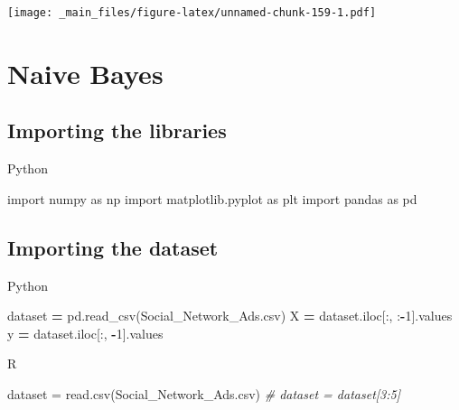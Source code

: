 \documentclass[
]{book}
\newenvironment{Shaded}{\begin{snugshade}}{\end{snugshade}}
\newcommand{\CommentTok}[1]{\textcolor[rgb]{0.56,0.35,0.01}{\textit{#1}}}
\newcommand{\DecValTok}[1]{\textcolor[rgb]{0.00,0.00,0.81}{#1}}
\newcommand{\FunctionTok}[1]{\textcolor[rgb]{0.00,0.00,0.00}{#1}}
\newcommand{\ImportTok}[1]{#1}
\newcommand{\NormalTok}[1]{#1}
\newcommand{\OperatorTok}[1]{\textcolor[rgb]{0.81,0.36,0.00}{\textbf{#1}}}
\newcommand{\OtherTok}[1]{\textcolor[rgb]{0.56,0.35,0.01}{#1}}
\newcommand{\StringTok}[1]{\textcolor[rgb]{0.31,0.60,0.02}{#1}}
\theoremstyle{definition}
\theoremstyle{definition}
\theoremstyle{definition}
\theoremstyle{definition}
\theoremstyle{remark}
\begin{document}
\texttt{[image: \_main\_files/figure-latex/unnamed-chunk-159-1.pdf]}

\hypertarget{naive-bayes}{%
\section{Naive Bayes}\label{naive-bayes}}

\hypertarget{importing-the-libraries-11}{%
\subsection{Importing the libraries}\label{importing-the-libraries-11}}

Python

\begin{Shaded}
\begin{Highlighting}[]
\ImportTok{import}\NormalTok{ numpy }\ImportTok{as}\NormalTok{ np}
\ImportTok{import}\NormalTok{ matplotlib.pyplot }\ImportTok{as}\NormalTok{ plt}
\ImportTok{import}\NormalTok{ pandas }\ImportTok{as}\NormalTok{ pd}
\end{Highlighting}
\end{Shaded}

\hypertarget{importing-the-dataset-11}{%
\subsection{Importing the dataset}\label{importing-the-dataset-11}}

Python

\begin{Shaded}
\begin{Highlighting}[]
\NormalTok{dataset }\OperatorTok{=}\NormalTok{ pd.read\_csv(}\StringTok{\textquotesingle{}Social\_Network\_Ads.csv\textquotesingle{}}\NormalTok{)}
\NormalTok{X }\OperatorTok{=}\NormalTok{ dataset.iloc[:, :}\OperatorTok{{-}}\DecValTok{1}\NormalTok{].values}
\NormalTok{y }\OperatorTok{=}\NormalTok{ dataset.iloc[:, }\OperatorTok{{-}}\DecValTok{1}\NormalTok{].values}
\end{Highlighting}
\end{Shaded}

R

\begin{Shaded}
\begin{Highlighting}[]
\NormalTok{dataset }\OtherTok{=} \FunctionTok{read.csv}\NormalTok{(}\StringTok{\textquotesingle{}Social\_Network\_Ads.csv\textquotesingle{}}\NormalTok{)}
\CommentTok{\# dataset = dataset[3:5]}
\end{Highlighting}
\end{Shaded}
\end{document}

